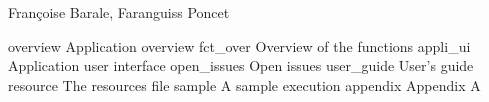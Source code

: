 %
%
%
%
%
%
%
%
%
%


 {Fran\c{c}oise Barale, Faranguiss Poncet}



\TOC
\newpage

	{overview}	{Application overview}
		{fct_over}	{Overview of the functions}
	\newpage
		{appli_ui}	{Application user interface}
	\newpage
		{open_issues}	{Open issues}
\newpage
{}	{user_guide}	{User's guide}
		{resource}	{The resources file}
	\newpage
		{sample}	{A sample execution}
\newpage
{}  {appendix}      {Appendix A}



